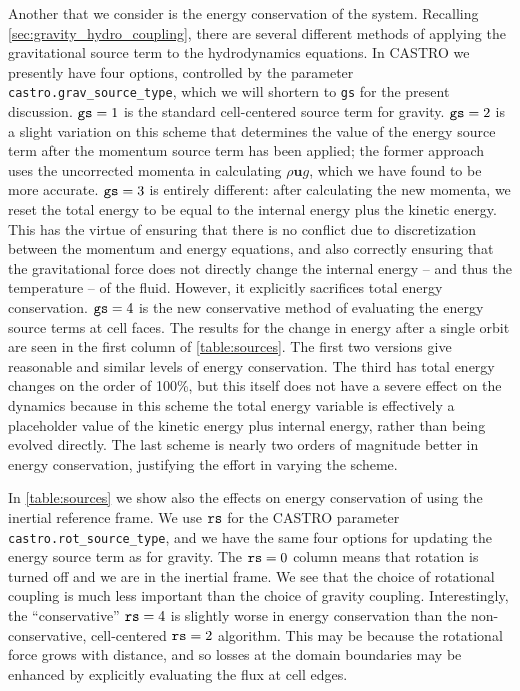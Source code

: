 \documentclass[iop]{../emulateapj}
\begin{document}
Another that we consider is the energy conservation of the system. Recalling \autoref{sec:gravity_hydro_coupling}, 
there are several different methods of applying the gravitational source term to the hydrodynamics equations. In CASTRO we presently 
have four options, controlled by the parameter {\tt castro.grav\_source\_type}, which we will shortern to {\tt gs} for the present 
discussion. ${\tt gs} = 1$ is the standard cell-centered source term for gravity. ${\tt gs} = 2$ is a slight variation on this scheme 
that determines the value of the energy source term after the momentum source term has been applied; the former approach uses 
the uncorrected momenta in calculating $\rho \mathbf{u} g$, which we have found to be more accurate. ${\tt gs} = 3$ is entirely 
different: after calculating the new momenta, we reset the total energy to be equal to the internal energy plus the 
kinetic energy. This has the virtue of ensuring that there is no conflict due to discretization between the momentum and 
energy equations, and also correctly ensuring that the gravitational force does not directly change the internal energy -- 
and thus the temperature -- of the fluid. However, it explicitly sacrifices total energy conservation. ${\tt gs} = 4$ is 
the new conservative method of evaluating the energy source terms at cell faces. The results for the change in energy 
after a single orbit are seen in the first column of \autoref{table:sources}. The first two versions give reasonable and 
similar levels of energy conservation. The third has total energy changes on the order of 100\%, but this itself 
does not have a severe effect on the dynamics because in this scheme the total energy variable is effectively a placeholder 
value of the kinetic energy plus internal energy, rather than being evolved directly. The last scheme is nearly two orders 
of magnitude better in energy conservation, justifying the effort in varying the scheme.

In \autoref{table:sources} we show also the effects on energy conservation of using the inertial reference frame. 
We use ${\tt rs}$ for the CASTRO parameter {\tt castro.rot\_source\_type}, and we have the same four options for updating
the energy source term as for gravity. The ${\tt rs} = 0$ column means that rotation is turned off and we are 
in the inertial frame. We see that the choice of rotational coupling is much less important than the choice of gravity coupling. 
Interestingly, the ``conservative'' ${\tt rs} = 4$ is slightly worse in energy conservation than the non-conservative, 
cell-centered ${\tt rs} = 2$ algorithm. This may be because the rotational force grows with distance, and so losses at the 
domain boundaries may be enhanced by explicitly evaluating the flux at cell edges.
\end{document}
